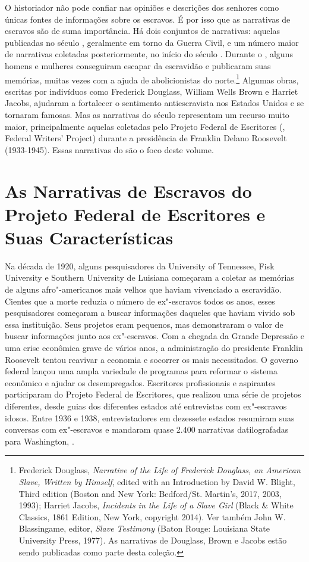 O historiador não pode confiar nas opiniões e descrições dos senhores
como únicas fontes de informações sobre os escravos. É por isso que as
narrativas de escravos são de suma importância. Há dois conjuntos de
narrativas: aquelas publicadas no século , geralmente em torno da
Guerra Civil, e um número maior de narrativas coletadas posteriormente,
no início do século . Durante o , alguns homens e mulheres
conseguiram escapar da escravidão e publicaram suas memórias, muitas
vezes com a ajuda de abolicionistas do norte.\footnote{Frederick
  Douglass, \emph{Narrative of the Life of Frederick Douglass, an
  American Slave, Written by Himself}, edited with an Introduction by
  David W. Blight, Third edition (Boston and New York: Bedford/St.
  Martin's, 2017, 2003, 1993); Harriet Jacobs, \emph{Incidents in the
  Life of a Slave Girl} (Black \& White Classics, 1861 Edition, New
  York, copyright 2014). Ver também John W. Blassingame, editor,
  \emph{Slave Testimony} (Baton Rouge: Louisiana State University Press,
  1977). As narrativas de Douglass, Brown e Jacobs estão sendo
  publicadas como parte desta coleção.} Algumas obras, escritas por
indivíduos como Frederick Douglass, William Wells Brown e Harriet
Jacobs, ajudaram a fortalecer o sentimento antiescravista nos Estados
Unidos e se tornaram famosas. Mas as narrativas do século  representam
um recurso muito maior, principalmente aquelas coletadas pelo Projeto
Federal de Escritores (, Federal Writers' Project) durante a
presidência de Franklin Delano Roosevelt (1933-1945). Essas narrativas
do  são o foco deste volume.

\section{As Narrativas de Escravos do Projeto Federal de Escritores e Suas
Características}

Na década de 1920, alguns pesquisadores da University of Tennessee, Fisk
University e Southern University de Luisiana começaram a coletar as
memórias de alguns afro"-americanos mais velhos que haviam vivenciado a
escravidão. Cientes que a morte reduzia o número de ex"-escravos todos os
anos, esses pesquisadores começaram a buscar informações daqueles que
haviam vivido sob essa instituição. Seus projetos eram pequenos, mas
demonstraram o valor de buscar informações junto aos ex"-escravos. Com a
chegada da Grande Depressão e uma crise econômica grave de vários anos,
a administração do presidente Franklin Roosevelt tentou reavivar a
economia e socorrer os mais necessitados. O governo federal lançou uma
ampla variedade de programas para reformar o sistema econômico e ajudar
os desempregados. Escritores profissionais e aspirantes participaram do
Projeto Federal de Escritores, que realizou uma série de projetos
diferentes, desde guias dos diferentes estados até entrevistas com
ex"-escravos idosos. Entre 1936 e 1938, entrevistadores em dezessete
estados resumiram suas conversas com ex"-escravos e mandaram quase 2.400
narrativas datilografadas para Washington, .

